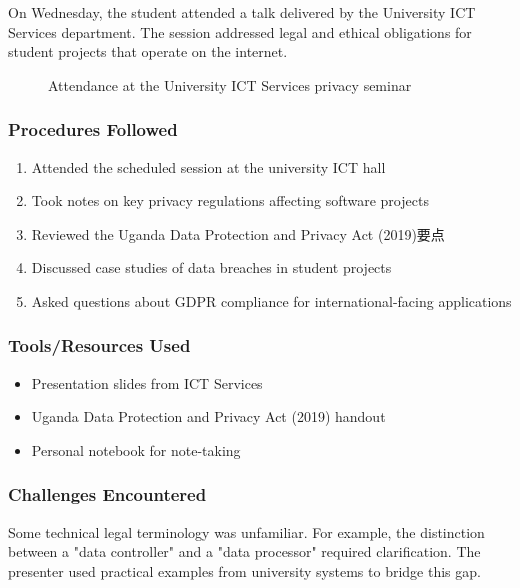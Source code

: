 \documentclass[12pt,a4paper]{article}
\begin{document}
On Wednesday, the student attended a talk delivered by the University ICT Services department. The session addressed legal and ethical obligations for student projects that operate on the internet.

\begin{figure}[H]
    \centering
    \caption{Attendance at the University ICT Services privacy seminar}
    \label{fig:ict_talk}
\end{figure}

\subsubsection*{Procedures Followed}
\begin{enumerate}
    \item Attended the scheduled session at the university ICT hall
    \item Took notes on key privacy regulations affecting software projects
    \item Reviewed the Uganda Data Protection and Privacy Act (2019)要点
    \item Discussed case studies of data breaches in student projects
    \item Asked questions about GDPR compliance for international-facing applications
\end{enumerate}

\subsubsection*{Tools/Resources Used}
\begin{itemize}
    \item Presentation slides from ICT Services
    \item Uganda Data Protection and Privacy Act (2019) handout
    \item Personal notebook for note-taking
\end{itemize}

\subsubsection*{Challenges Encountered}
Some technical legal terminology was unfamiliar. For example, the distinction between a "data controller" and a "data processor" required clarification. The presenter used practical examples from university systems to bridge this gap.
\end{document}
